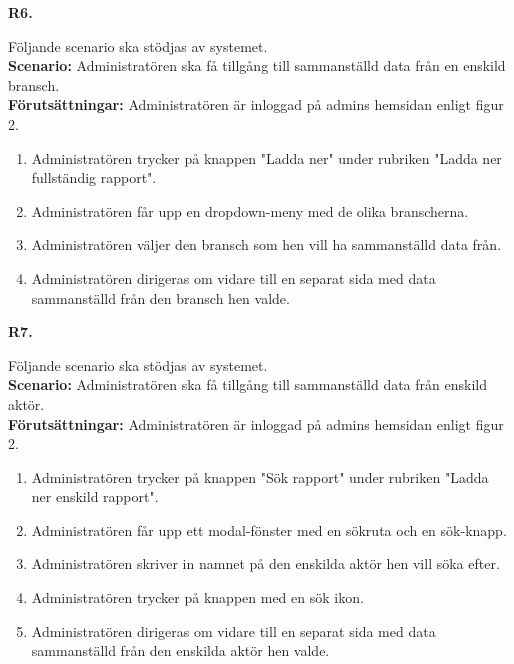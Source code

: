 \documentclass{article}
\begin{document}
\vspace{1em}
\noindent \large{\textbf{R6.}}
    \normalsize{Följande scenario ska stödjas av systemet.
        \\
      \textbf{Scenario:} Administratören ska få tillgång till sammanställd data från en enskild bransch.
        \\
      \textbf{Förutsättningar:} Administratören är inloggad på admins hemsidan enligt figur 2.
            \begin{enumerate}
                \item Administratören trycker på knappen "Ladda ner" under rubriken "Ladda ner fullständig rapport".
                \item Administratören får upp en dropdown-meny med de olika branscherna.
                \item Administratören väljer den bransch som hen vill ha sammanställd data från.
                \item  Administratören dirigeras om vidare till en separat sida med data sammanställd från den bransch hen valde.
            \end{enumerate}
            
           } 
           \vspace{1em}
\noindent \large{\textbf{R7.}}
    \normalsize{Följande scenario ska stödjas av systemet.
        \\
       \textbf{Scenario:} Administratören ska få tillgång till sammanställd data från enskild aktör.
        \\
       \textbf{Förutsättningar:} Administratören är inloggad på admins hemsidan enligt figur 2.
            \begin{enumerate}
                \item Administratören trycker på knappen "Sök rapport" under rubriken "Ladda ner enskild rapport".
                \item Administratören får upp ett modal-fönster med en sökruta och en sök-knapp.
                \item Administratören skriver in namnet på den enskilda aktör hen vill söka efter.
                \item Administratören trycker på knappen med en sök ikon.
                \item  Administratören dirigeras om vidare till en separat sida med data sammanställd från den enskilda aktör hen valde.
            \end{enumerate}
    }
    
\end{document}
